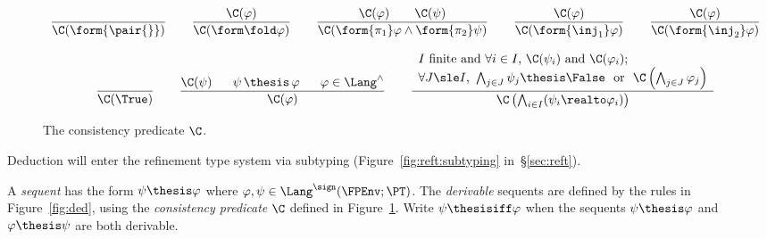 \begin{figure}[t!]
\centering
\(
\begin{array}{c}
%
\dfrac
  {}
  {\C(\form{\pair{}})}
%
\qquad
%
\dfrac{\C(\varphi)}
  {\C(\form\fold \varphi)}
%
\qquad
%
\dfrac{\C(\varphi) 
  \qquad
  \C(\psi)}
  {\C(\form{\pi_1}\varphi \land \form{\pi_2}\psi)}
%
\qquad
%
\dfrac{\C(\varphi)}
  {\C(\form{\inj_1}\varphi)}
%
\qquad
%
\dfrac{\C(\varphi)}
  {\C(\form{\inj_2}\varphi)}
%
\\\\
%
\dfrac{}{\C(\True)}
%
\qquad
%
\dfrac{\C(\psi)
  \quad~~
  \psi \,\thesis\, \varphi
  \quad~~
  \varphi \in \Lang^\land}
  {\C(\varphi)}
%
\qquad
%
\dfrac{\begin{array}{l}
  \text{$I$ finite and $\forall i \in I$,}~
  \C(\psi_i) 
  ~\text{and}~
  \C(\varphi_i) ;
  \\
  \text{$\forall J \sle I$,}~
  \bigwedge_{j \in J} \psi_j \thesis \False
  ~~\text{or}~~
  \C\left( \bigwedge_{j \in J} \varphi_j \right)
  \end{array}}
  {\C\left( \bigwedge_{i \in I}(\psi_i \realto \varphi_i) \right)}
%
\end{array}
\)
\caption{The consistency predicate $\C$.%
\label{fig:consist}}
\end{figure}

Deduction
will enter the refinement type system via subtyping
(Figure~\ref{fig:reft:subtyping} in~\S\ref{sec:reft}).

\begin{definition}[Deduction]
\label{def:ded}
A \emph{sequent} has the form $\psi \thesis \varphi$
where $\varphi,\psi \in \Lang^\sign(\FPEnv; \PT)$.
%
The \emph{derivable} sequents are defined by 
the rules in Figure~\ref{fig:ded},
using the \emph{consistency predicate} $\C$
defined in Figure~\ref{fig:consist}.
%
Write $\psi \thesisiff \varphi$ when the sequents
$\psi \thesis \varphi$ and $\varphi \thesis \psi$
are both derivable.
\end{definition}


